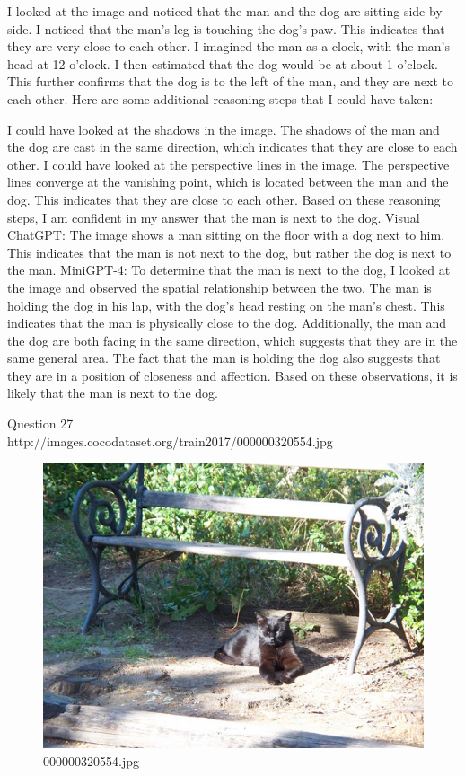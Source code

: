\begin{enumerate}
        I looked at the image and noticed that the man and the dog are sitting side by side.
        I noticed that the man's leg is touching the dog's paw. This indicates that they are very close to each other.
        I imagined the man as a clock, with the man's head at 12 o'clock. I then estimated that the dog would be at about 1 o'clock. This further confirms that the dog is to the left of the man, and they are next to each other.
        Here are some additional reasoning steps that I could have taken:
        
        I could have looked at the shadows in the image. The shadows of the man and the dog are cast in the same direction, which indicates that they are close to each other.
        I could have looked at the perspective lines in the image. The perspective lines converge at the vanishing point, which is located between the man and the dog. This indicates that they are close to each other.
        Based on these reasoning steps, I am confident in my answer that the man is next to the dog.
        \subitem Visual ChatGPT: The image shows a man sitting on the floor with a dog next to him. This indicates that the man is not next to the dog, but rather the dog is next to the man.
        \subitem MiniGPT-4: To determine that the man is next to the dog, I looked at the image and observed the spatial relationship between the two. The man is holding the dog in his lap, with the dog’s head resting on the man’s chest. This indicates that the man is physically close to the dog. Additionally, the man and the dog are both facing in the same direction, which suggests that they are in the same general area. The fact that the man is holding the dog also suggests that they are in a position of closeness and affection. Based on these observations, it is likely that the man is next to the dog.
    \end{enumerate}
Question 27\\
http://images.cocodataset.org/train2017/000000320554.jpg
    \begin{figure}[h]
        \centering
        \includegraphics[width=0.8\linewidth]{../image set/easy/000000320554.jpg}
        \caption{000000320554.jpg}
    \end{figure}
